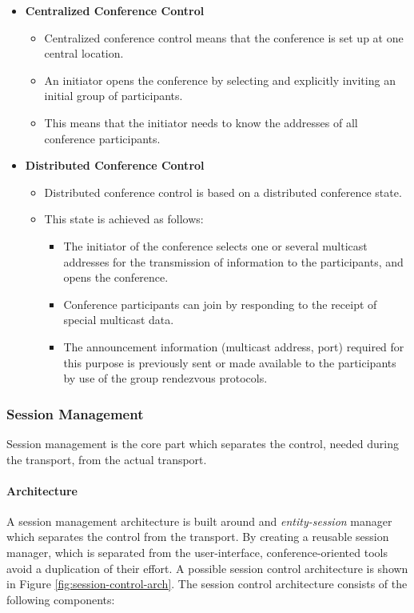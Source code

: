 \begin{itemize}
	\item \textbf{Centralized Conference Control}
	\begin{itemize}
		\item Centralized conference control means that the conference is set up at one central location. 
		\item An initiator opens the conference by selecting and explicitly inviting an initial group of participants.
		\item This means that the initiator needs to know the addresses of all conference participants.
	\end{itemize}
\item \textbf{Distributed Conference Control}
\begin{itemize}
	\item Distributed conference control is based on a distributed conference state. 
	\item This state is	achieved as follows: 
	\begin{itemize}
		\item The initiator of the conference selects one or several multicast addresses for the transmission of information to the participants, and opens the conference. 
		\item Conference participants can join by responding to the receipt of special multicast data. 
		\item The announcement information (multicast address, port) required for this purpose is previously sent or made available to the participants by use of the group rendezvous protocols.
	\end{itemize}
\end{itemize}
\end{itemize}

\subsubsection{Session Management}
Session management is the core part which separates the control, needed during the transport, from the actual transport.

\paragraph{Architecture}
A session management architecture is built around and \textit{entity-session} manager which separates the control from the transport. By creating a reusable session manager, which is separated from the user-interface, conference-oriented tools avoid a duplication of their effort. A possible session control architecture is shown in Figure \ref{fig:session-control-arch}. The session control architecture consists of the following components:


